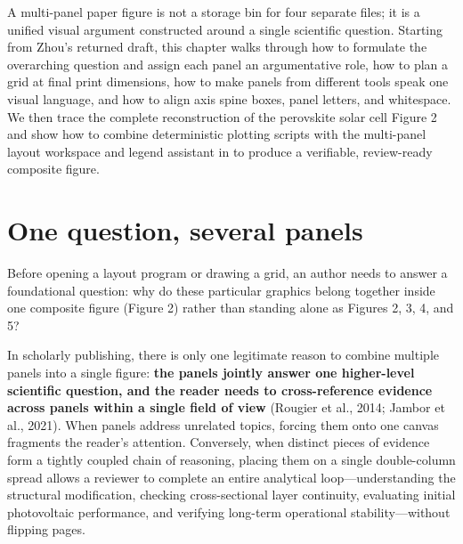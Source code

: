 A multi-panel paper figure is not a storage bin for four separate files; it is a unified visual argument constructed around a single scientific question. Starting from Zhou's returned draft, this chapter walks through how to formulate the overarching question and assign each panel an argumentative role, how to plan a grid at final print dimensions, how to make panels from different tools speak one visual language, and how to align axis spine boxes, panel letters, and whitespace. We then trace the complete reconstruction of the perovskite solar cell Figure 2 and show how to combine deterministic plotting scripts with the multi-panel layout workspace and legend assistant in \scidraw{} to produce a verifiable, review-ready composite figure.

\section{One question, several panels}

Before opening a layout program or drawing a grid, an author needs to answer a foundational question: why do these particular graphics belong together inside one composite figure (Figure 2) rather than standing alone as Figures 2, 3, 4, and 5?

In scholarly publishing, there is only one legitimate reason to combine multiple panels into a single figure: \textbf{the panels jointly answer one higher-level scientific question, and the reader needs to cross-reference evidence across panels within a single field of view} (Rougier et al., 2014; Jambor et al., 2021). When panels address unrelated topics, forcing them onto one canvas fragments the reader's attention. Conversely, when distinct pieces of evidence form a tightly coupled chain of reasoning, placing them on a single double-column spread allows a reviewer to complete an entire analytical loop---understanding the structural modification, checking cross-sectional layer continuity, evaluating initial photovoltaic performance, and verifying long-term operational stability---without flipping pages.

